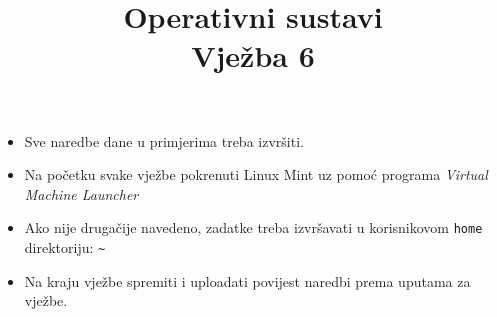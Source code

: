 \documentclass[a4paper,12pt]{article}
\title
{Operativni sustavi\\
Vježba 6}
\date{}
\begin{document}
\maketitle
{}



\begin{itemize}
\item Sve naredbe dane u primjerima treba izvršiti.
\item Na početku svake vježbe pokrenuti Linux Mint uz pomoć programa \textit{Virtual Machine Launcher}
\item Ako nije drugačije navedeno, zadatke treba izvršavati u korisnikovom \texttt{home} direktoriju: \lstinline!~!
\item Na kraju vježbe spremiti i uploadati povijest naredbi prema uputama za vježbe.

\end{itemize}

\end{document}
